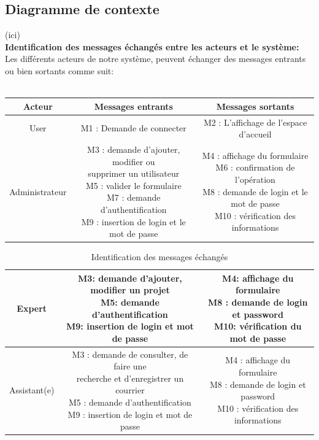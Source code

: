 \documentclass[14pt,A4,french,oneside,leqno]{report}
\begin{document}
\subsection{Diagramme de contexte}
 (ici)\\ 
 \indent \textbf{Identification des messages échangés entre les acteurs et le système:}\\
 \indent \textrm{Les différents acteurs de notre système, peuvent échanger des messages entrants ou bien sortants comme suit:}\\ \\
 \begin{tabular}{|c|c|c|}
		\hline 
\textbf{Acteur}&  \textbf{Messages entrants}&  \textbf{Messages sortants} \\ 
\hline 
User& M1 : Demande de connecter &M2 : L’affichage de l’espace d’accueil \\ 
\hline 
Administrateur& \parbox{0.4\linewidth}{M3 : demande d’ajouter, modifier ou\\supprimer un utilisateur\\M5 : valider le formulaire\\M7 : demande d’authentification\\M9 : insertion de login et le mot de passe}  & \parbox{0.4\linewidth}{M4 : affichage du formulaire\\M6 : confirmation de l’opération\\M8 : demande de login et le mot de passe\\M10 : vérification des informations}  \\ 
\hline 
 \end{tabular} 

\begin{table}
		\begin{tabular}{|c|c|c|}
		\hline 
		Expert& \parbox{0.4\linewidth}{M3: demande d'ajouter, modifier un projet\\M5: demande d'authentification\\M9: insertion de login et mot de passe} &\parbox{0.4\linewidth}{M4: affichage du formulaire\\M8 : demande de login et password\\M10: vérification du mot de passe}   \\ 
		\hline 
		Assistant(e)& \parbox{0.4\linewidth}{M3 : demande de consulter, de faire une\\  recherche et  d'enregistrer un courrier\\M5 : demande d’authentification\\M9 : insertion de login et mot de passe} &
		\parbox{0.4\linewidth}{M4 : affichage du formulaire\\M8 : demande de login et password\\M10 : vérification des informations}  \\ 
		\hline 
	\end{tabular} 
	\caption{Identification des messages échangés}
\end{table}	
	
\end{document}
